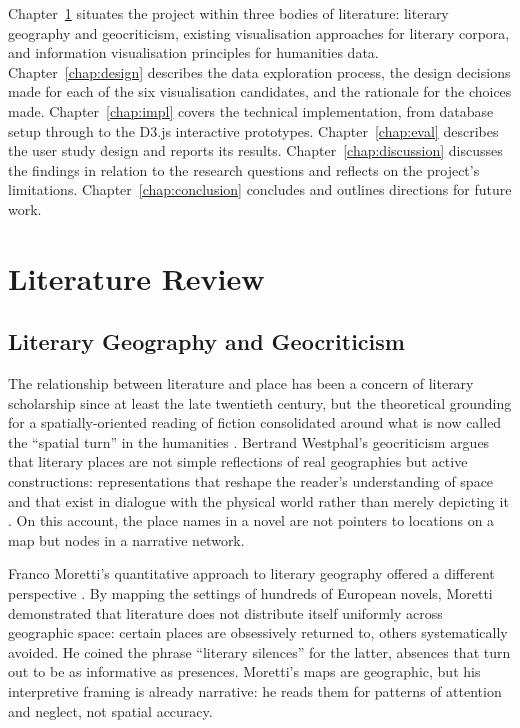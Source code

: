\documentclass[logo,msc]{infthesis}
\begin{document}
Chapter~\ref{chap:lit} situates the project within three bodies of literature: literary geography and geocriticism, existing visualisation approaches for literary corpora, and information visualisation principles for humanities data. Chapter~\ref{chap:design} describes the data exploration process, the design decisions made for each of the six visualisation candidates, and the rationale for the choices made. Chapter~\ref{chap:impl} covers the technical implementation, from database setup through to the D3.js interactive prototypes. Chapter~\ref{chap:eval} describes the user study design and reports its results. Chapter~\ref{chap:discussion} discusses the findings in relation to the research questions and reflects on the project's limitations. Chapter~\ref{chap:conclusion} concludes and outlines directions for future work.
 
 
\chapter{Literature Review}
\label{chap:lit}
 
\section{Literary Geography and Geocriticism}
 
The relationship between literature and place has been a concern of literary scholarship since at least the late twentieth century, but the theoretical grounding for a spatially-oriented reading of fiction consolidated around what is now called the ``spatial turn'' in the humanities \cite{tally2013}. Bertrand Westphal's geocriticism argues that literary places are not simple reflections of real geographies but active constructions: representations that reshape the reader's understanding of space and that exist in dialogue with the physical world rather than merely depicting it \cite{westphal2011}. On this account, the place names in a novel are not pointers to locations on a map but nodes in a narrative network.
 
Franco Moretti's quantitative approach to literary geography offered a different perspective \cite{moretti2005}. By mapping the settings of hundreds of European novels, Moretti demonstrated that literature does not distribute itself uniformly across geographic space: certain places are obsessively returned to, others systematically avoided. He coined the phrase ``literary silences'' for the latter, absences that turn out to be as informative as presences. Moretti's maps are geographic, but his interpretive framing is already narrative: he reads them for patterns of attention and neglect, not spatial accuracy.
\end{document}
